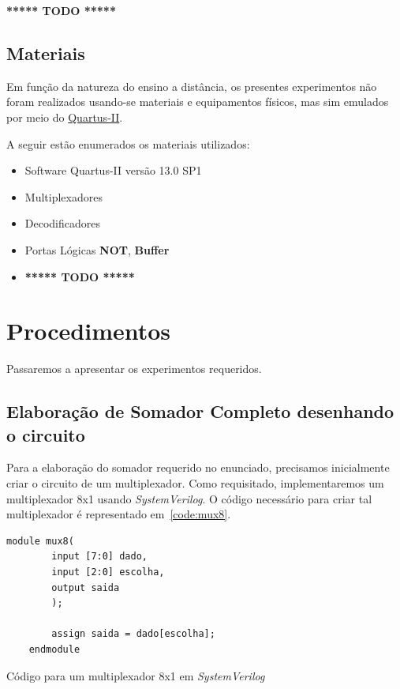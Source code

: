 \documentclass[12pt]{article}
\begin{document}
\textbf{***** TODO *****}

\subsection{Materiais}
\label{sec:Materiais}
Em função da natureza do ensino a distância, os presentes experimentos não foram
realizados usando-se materiais e equipamentos físicos, mas sim emulados por meio
do
\href{https://www.intel.com/content/www/us/en/software/programmable/quartus-prime/download.html}{Quartus-II}.

A seguir estão enumerados os materiais utilizados:
\begin{itemize}
    \item Software Quartus-II versão 13.0 SP1
    \item Multiplexadores
    \item Decodificadores
    \item Portas Lógicas \textbf{NOT}, \textbf{Buffer}
    \item \textbf{***** TODO *****}
\end{itemize}

\section{Procedimentos}
\label{sec:Procedimentos}

Passaremos a apresentar os experimentos requeridos.

\subsection{Elaboração de Somador Completo desenhando o circuito}\label{sec:2.1}

Para a elaboração do somador requerido no enunciado, precisamos inicialmente
criar o circuito de um multiplexador. Como requisitado, implementaremos um
multiplexador 8x1 usando \emph{SystemVerilog}. O código necessário para criar
tal multiplexador é representado em~\ref{code:mux8}.

\begin{center}
    \begin{lstlisting}[style={verilog-style}]
    module mux8(
        input [7:0] dado,
        input [2:0] escolha,
        output saida
        );

        assign saida = dado[escolha];
    endmodule
    \end{lstlisting}
    \caption{Código para um multiplexador 8x1 em \emph{SystemVerilog}}\label{code:mux8}
\end{center}
\end{document}
